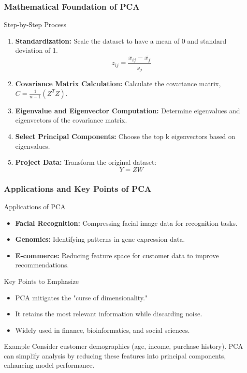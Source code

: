 \documentclass[aspectratio=169]{beamer}
\begin{document}
\begin{frame}[fragile]
    \frametitle{Mathematical Foundation of PCA}
    \begin{block}{Step-by-Step Process}
        \begin{enumerate}
            \item \textbf{Standardization:} Scale the dataset to have a mean of 0 and standard deviation of 1.
            \[
            z_{ij} = \frac{x_{ij} - \bar{x_j}}{s_j}
            \]
            \item \textbf{Covariance Matrix Calculation:} Calculate the covariance matrix, \( C = \frac{1}{n-1} (Z^T Z) \).
            \item \textbf{Eigenvalue and Eigenvector Computation:} Determine eigenvalues and eigenvectors of the covariance matrix.
            \item \textbf{Select Principal Components:} Choose the top k eigenvectors based on eigenvalues.
            \item \textbf{Project Data:} Transform the original dataset:
            \[
            Y = Z W
            \]
        \end{enumerate}
    \end{block}
\end{frame}

\begin{frame}[fragile]
    \frametitle{Applications and Key Points of PCA}
    \begin{block}{Applications of PCA}
        \begin{itemize}
            \item \textbf{Facial Recognition:} Compressing facial image data for recognition tasks.
            \item \textbf{Genomics:} Identifying patterns in gene expression data.
            \item \textbf{E-commerce:} Reducing feature space for customer data to improve recommendations.
        \end{itemize}
    \end{block}
    
    \begin{block}{Key Points to Emphasize}
        \begin{itemize}
            \item PCA mitigates the "curse of dimensionality."
            \item It retains the most relevant information while discarding noise.
            \item Widely used in finance, bioinformatics, and social sciences.
        \end{itemize}
    \end{block}
    
    \begin{block}{Example}
        Consider customer demographics (age, income, purchase history). PCA can simplify analysis by reducing these features into principal components, enhancing model performance.
    \end{block}
\end{frame}
\end{document}
